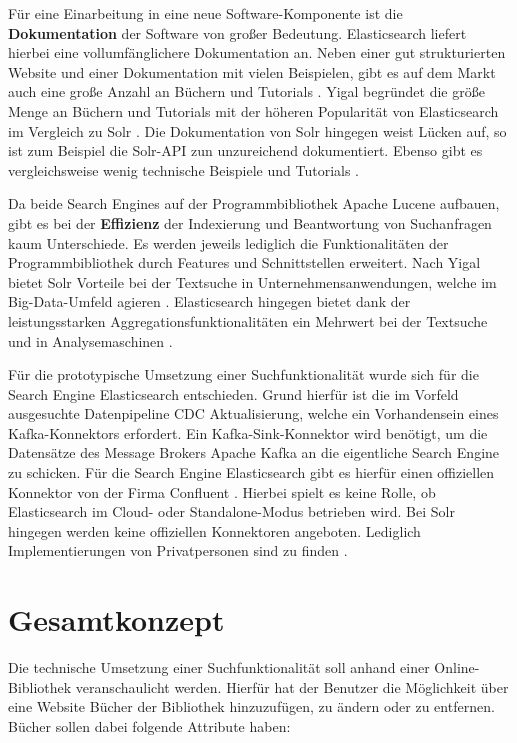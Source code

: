 Für eine Einarbeitung in eine neue Software-Komponente ist die \textbf{Dokumentation} der Software von großer Bedeutung. Elasticsearch liefert hierbei eine vollumfänglichere Dokumentation an. Neben einer gut strukturierten Website und einer Dokumentation mit vielen Beispielen, gibt es auf dem Markt auch eine große Anzahl an Büchern und Tutorials \cite{AsafYigal.2020}. Yigal begründet die größe Menge an Büchern und Tutorials mit der höheren Popularität von Elasticsearch im Vergleich zu Solr \cite{AsafYigal.2020}. Die Dokumentation von Solr hingegen weist Lücken auf, so ist zum Beispiel die Solr-API zun unzureichend dokumentiert. Ebenso gibt es vergleichsweise wenig technische Beispiele und Tutorials \cite{AsafYigal.2020}.

Da beide Search Engines auf der Programmbibliothek \glqq Apache Lucene\grqq{} aufbauen, gibt es bei der \textbf{Effizienz} der Indexierung und Beantwortung von Suchanfragen kaum Unterschiede. Es werden jeweils lediglich die Funktionalitäten der Programmbibliothek durch Features und Schnittstellen erweitert. Nach Yigal bietet Solr Vorteile bei der Textsuche in Unternehmensanwendungen, welche im Big-Data-Umfeld agieren \cite{AsafYigal.2020}. Elasticsearch hingegen bietet dank der leistungsstarken Aggregationsfunktionalitäten ein Mehrwert bei der Textsuche und in Analysemaschinen \cite{AsafYigal.2020}.

Für die prototypische Umsetzung einer Suchfunktionalität wurde sich für die Search Engine Elasticsearch entschieden. Grund hierfür ist die im Vorfeld ausgesuchte Datenpipeline \glqq CDC Aktualisierung\grqq{}, welche ein Vorhandensein eines Kafka-Konnektors erfordert. Ein Kafka-Sink-Konnektor wird benötigt, um die Datensätze des Message Brokers \glqq Apache Kafka\grqq{} an die eigentliche Search Engine zu schicken. Für die Search Engine Elasticsearch gibt es hierfür einen offiziellen Konnektor von der Firma Confluent \cite{Confluent.2021}. Hierbei spielt es keine Rolle, ob Elasticsearch im Cloud- oder Standalone-Modus betrieben wird. Bei Solr hingegen werden keine offiziellen Konnektoren angeboten. Lediglich Implementierungen von Privatpersonen sind zu finden \cite{bkatwal.2021}.

\section{Gesamtkonzept\label{sec4.3:Unterpunkt-3}}

Die technische Umsetzung einer Suchfunktionalität soll anhand einer Online-Bibliothek veranschaulicht werden. Hierfür hat der Benutzer die Möglichkeit über eine Website Bücher der Bibliothek hinzuzufügen, zu ändern oder zu entfernen. Bücher sollen dabei folgende Attribute haben:


